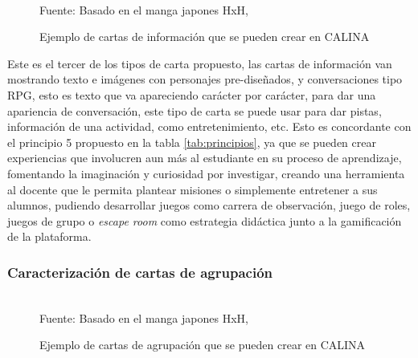 \begin{figure}[H]
\caption{Ejemplo de cartas de información que se pueden crear en CALINA}
\label{img:modelodecartasinfo}
\centering
\begin{adjustbox}{width=12cm}
\end{adjustbox}
\\
{\footnotesize Fuente: Basado en el manga japones HxH, }
\end{figure}

Este es el tercer de los tipos de carta propuesto, las cartas de información van mostrando texto e 
imágenes con personajes pre-diseñados, y conversaciones tipo RPG, esto es texto que va apareciendo carácter 
por carácter, para dar una apariencia de conversación, este tipo de carta se puede usar para dar pistas, 
información de una actividad, como entretenimiento, etc. Esto es concordante con el principio 5 propuesto en 
la tabla \ref{tab:principios}, ya que se pueden crear experiencias que involucren aun más al estudiante en su 
proceso de aprendizaje, fomentando la imaginación y curiosidad por investigar, creando una herramienta al 
docente que le permita plantear misiones o simplemente entretener a sus alumnos, pudiendo desarrollar juegos 
como carrera de observación, juego de roles, juegos de grupo o \textit{escape room} como estrategia didáctica 
junto a la gamificación de la plataforma.

\subsubsection{Caracterización de cartas de agrupación}

\begin{figure}[!htb]
\caption{Ejemplo de cartas de agrupación que se pueden crear en CALINA}
\label{img:modelodecartasgrupo}
\centering
\begin{adjustbox}{width=12cm}
\end{adjustbox}
\\
{\footnotesize Fuente: Basado en el manga japones HxH, }
\end{figure}

